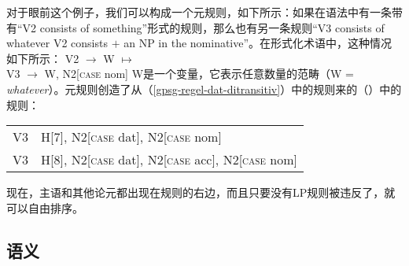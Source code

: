 对于眼前这个例子，我们可以构成一个元规则，如下所示：如果在语法中有一条带有“V2 consists of something”形式的规则，那么也有另一条规则“V3 consists of whatever V2 consists $+$ an NP in the nominative”。在形式化术语中，这种情况如下所示：
\ea
\label{subjekt-meta}
V2  $\to$ W $\mapsto$\\
V3  $\to$ W, N2[\textsc{case} nom]
\z
W是一个变量，它表示任意数量的范畴（W = \emph{what\-ever}）。元规则创造了从（\ref{gpsg-regel-dat-ditransitiv}）中的规则来的（）中的规则：
\ea
\begin{tabular}[t]{@{}l@{~$\to$~}l@{}}
V3  & H[7], N2[\textsc{case} dat], N2[\textsc{case} nom]                \\
V3  & H[8], N2[\textsc{case} dat], N2[\textsc{case} acc], N2[\textsc{case} nom]  \\
\end{tabular}
\z

\noindent
现在，主语和其他论元都出现在规则的右边，而且只要没有LP规则被违反了，就可以自由排序。

\subsection{语义}
\label{Sec-GPSG-Sem}

